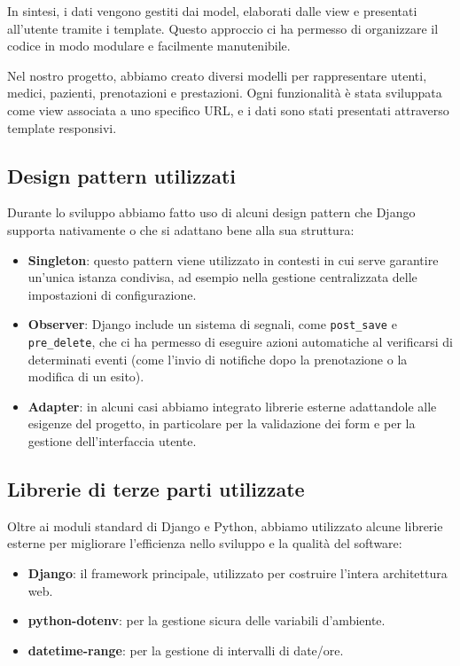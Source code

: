\documentclass[a4paper,12pt]{article}
\begin{document}
In sintesi, i dati vengono gestiti dai model, elaborati dalle view e presentati all’utente tramite i template. 
Questo approccio ci ha permesso di organizzare il codice in modo modulare e facilmente manutenibile.

Nel nostro progetto, abbiamo creato diversi modelli per rappresentare utenti, medici, pazienti, prenotazioni e prestazioni. 
Ogni funzionalità è stata sviluppata come view associata a uno specifico URL, e i dati sono stati presentati attraverso template responsivi.
\newpage
\subsection{Design pattern utilizzati}

Durante lo sviluppo abbiamo fatto uso di alcuni design pattern che Django supporta nativamente o che si adattano bene alla sua struttura:

\begin{itemize}
    \item \textbf{Singleton}: questo pattern viene utilizzato in contesti in cui serve garantire un’unica istanza condivisa, ad esempio nella gestione centralizzata delle impostazioni di configurazione.
    
    \item \textbf{Observer}: Django include un sistema di segnali, come \texttt{post\_save} e \texttt{pre\_delete}, che ci ha permesso di eseguire azioni automatiche al verificarsi di determinati eventi (come l’invio di notifiche dopo la prenotazione o la modifica di un esito).
    
    \item \textbf{Adapter}: in alcuni casi abbiamo integrato librerie esterne adattandole alle esigenze del progetto, in particolare per la validazione dei form e per la gestione dell’interfaccia utente.
\end{itemize}

\subsection{Librerie di terze parti utilizzate}

Oltre ai moduli standard di Django e Python, abbiamo utilizzato alcune librerie esterne per migliorare l’efficienza nello sviluppo e la qualità del software:

\begin{itemize}
    \item \textbf{Django}: il framework principale, utilizzato per costruire l’intera architettura web.
    \item \textbf{python-dotenv}: per la gestione sicura delle variabili d’ambiente.
    \item \textbf{datetime-range}: per la gestione di intervalli di date/ore.
\end{itemize}
\end{document}
